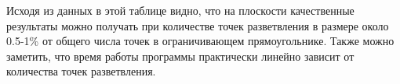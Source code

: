 Исходя из данных в этой таблице видно, что на плоскости качественные результаты можно получать при количестве точек разветвления в размере около 0.5-1\% от общего числа точек в ограничивающем прямоугольнике. Также можно заметить, что время работы программы практически линейно зависит от количества точек разветвления.










